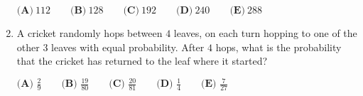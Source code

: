 \documentclass{article}
\begin{document}
\begin{enumerate}[label=\arabic*., itemsep=0.5em]
\(\textbf{(A)} ~112\qquad\textbf{(B)} ~128\qquad\textbf{(C)} ~192\qquad\textbf{(D)} ~240\qquad\textbf{(E)} ~288\)\par \vspace{0.5em}\item A cricket randomly hops between \(4\) leaves, on each turn hopping to one of the other \(3\) leaves with equal probability. After \(4\) hops, what is the probability that the cricket has returned to the leaf where it started?



\(\textbf{(A) }\frac{2}{9}\qquad\textbf{(B) }\frac{19}{80}\qquad\textbf{(C) }\frac{20}{81}\qquad\textbf{(D) }\frac{1}{4}\qquad\textbf{(E) }\frac{7}{27}\)\par \vspace{0.5em}\end{enumerate}
\end{document}
